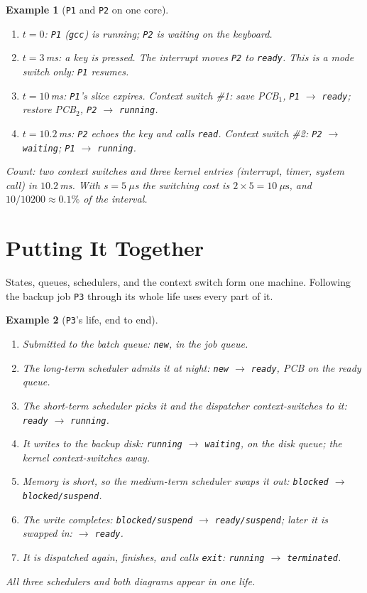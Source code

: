 \documentclass[11pt]{article}
\newtheorem{example}{Example}
\begin{document}
\begin{example}[\texttt{P1} and \texttt{P2} on one core]
\label{ex:p1p2}
\begin{enumerate}
  \item $t = 0$: \texttt{P1} (\texttt{gcc}) is running; \texttt{P2} is waiting
        on the keyboard.
  \item $t = 3$\,ms: a key is pressed. The interrupt moves \texttt{P2} to
        \texttt{ready}. This is a mode switch only: \texttt{P1} resumes.
  \item $t = 10$\,ms: \texttt{P1}'s slice expires. Context switch \#1: save
        PCB$_1$, \texttt{P1} $\to$ \texttt{ready}; restore PCB$_2$,
        \texttt{P2} $\to$ \texttt{running}.
  \item $t = 10.2$\,ms: \texttt{P2} echoes the key and calls \texttt{read}.
        Context switch \#2: \texttt{P2} $\to$ \texttt{waiting}; \texttt{P1}
        $\to$ \texttt{running}.
\end{enumerate}
\emph{Count:} two context switches and three kernel entries (interrupt, timer,
system call) in $10.2$\,ms. With $s = 5\ \mu$s the switching cost is
$2 \times 5 = 10\ \mu\text{s}$, and $10/10200 \approx 0.1\%$ of the interval.
\end{example}

\section{Putting It Together}

States, queues, schedulers, and the context switch form one machine. Following
the backup job \texttt{P3} through its whole life uses every part of it.

\begin{example}[\texttt{P3}'s life, end to end]
\begin{enumerate}
  \item Submitted to the batch queue: \texttt{new}, in the job queue.
  \item The long-term scheduler admits it at night: \texttt{new} $\to$
        \texttt{ready}, PCB on the ready queue.
  \item The short-term scheduler picks it and the dispatcher context-switches
        to it: \texttt{ready} $\to$ \texttt{running}.
  \item It writes to the backup disk: \texttt{running} $\to$ \texttt{waiting},
        on the disk queue; the kernel context-switches away.
  \item Memory is short, so the medium-term scheduler swaps it out:
        \texttt{blocked} $\to$ \texttt{blocked/suspend}.
  \item The write completes: \texttt{blocked/suspend} $\to$
        \texttt{ready/suspend}; later it is swapped in: $\to$ \texttt{ready}.
  \item It is dispatched again, finishes, and calls \texttt{exit}:
        \texttt{running} $\to$ \texttt{terminated}.
\end{enumerate}
All three schedulers and both diagrams appear in one life.
\end{example}
\end{document}
